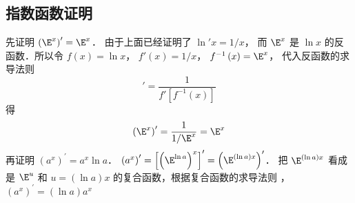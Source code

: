 \subsection{指数函数证明}
先证明 ${\left( {{\E^x}} \right)^\prime } = {\E^x}$． 
由于上面已经证明了 $ \ln'x = {1}/{x}$， 而 ${\E^x}$ 是 $\ln x$ 的反函数．所以令 $f\left( x \right) = \ln x$， $f'\left( x \right) = 1/x$，  ${f^{ - 1}}\left( x \right) = {\E^x}$， 代入反函数的求导法则%
\begin{equation}
[{f^{ - 1}}\left( x \right)]' = \frac{1}{{f'[{{f^{ - 1}}(x)} ]}} 
\end{equation} 
得
\begin{equation}
{\left( {{\E^x}} \right)^\prime } = \frac{1}{{1/{\E^x}}} = {\E^x} 
\end{equation}
再证明 ${\left( {{a^x}} \right)^\prime } = {a^x}\ln a$．  ${\left( {{a^x}} \right)^\prime } = {\left[ {{{\left( {{\E^{\ln a}}} \right)}^x}} \right]^\prime } = {\left( {{\E^{\left( {\ln a} \right)x}}} \right)^\prime }$． 把 ${\E^{\left( {\ln a} \right)x}}$ 看成是 ${\E^u}$ 和 $u = \left( {\ln a} \right)x$ 的复合函数，根据复合函数的求导法则%
， ${\left( {{a^x}} \right)^\prime } = \left( {\ln a} \right){a^x}$ 



















